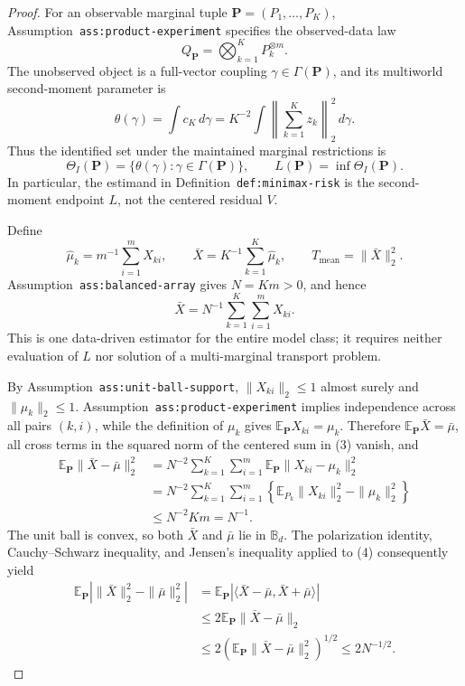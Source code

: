 \documentclass{article}
\begin{document}
\begin{proof}
For an observable marginal tuple \(\mathbf P=(P_1,\ldots,P_K)\), Assumption~\texttt{ass:product-experiment} specifies the observed-data law
\[
Q_{\mathbf P}=\bigotimes_{k=1}^K P_k^{\otimes m}.
\]
The unobserved object is a full-vector coupling \(\gamma\in\Gamma(\mathbf P)\), and its multiworld second-moment parameter is
\[
\theta(\gamma)=\int c_K\,d\gamma
=K^{-2}\int\left\|\sum_{k=1}^K z_k\right\|_2^2\,d\gamma.
\]
Thus the identified set under the maintained marginal restrictions is
\[
\Theta_I(\mathbf P)=\{\theta(\gamma):\gamma\in\Gamma(\mathbf P)\},
\qquad
L(\mathbf P)=\inf\Theta_I(\mathbf P).
\tag{1}
\]
In particular, the estimand in Definition~\texttt{def:minimax-risk} is the second-moment endpoint \(L\), not the centered residual \(V\).

Define
\[
\widehat\mu_k=m^{-1}\sum_{i=1}^m X_{ki},
\qquad
\bar X=K^{-1}\sum_{k=1}^K\widehat\mu_k,
\qquad
T_{\mathrm{mean}}=\|\bar X\|_2^2.
\tag{2}
\]
Assumption~\texttt{ass:balanced-array} gives \(N=Km>0\), and hence
\[
\bar X=N^{-1}\sum_{k=1}^K\sum_{i=1}^m X_{ki}.
\tag{3}
\]
This is one data-driven estimator for the entire model class; it requires neither evaluation of \(\widehat L\) nor solution of a multi-marginal transport problem.

By Assumption~\texttt{ass:unit-ball-support}, \(\|X_{ki}\|_2\leq 1\) almost surely and \(\|\mu_k\|_2\leq 1\).  Assumption~\texttt{ass:product-experiment} implies independence across all pairs \((k,i)\), while the definition of \(\mu_k\) gives \(\mathbb E_{\mathbf P}X_{ki}=\mu_k\).  Therefore \(\mathbb E_{\mathbf P}\bar X=\bar\mu\), all cross terms in the squared norm of the centered sum in (3) vanish, and
\[
\begin{aligned}
\mathbb E_{\mathbf P}\|\bar X-\bar\mu\|_2^2
&=N^{-2}\sum_{k=1}^K\sum_{i=1}^m
  \mathbb E_{\mathbf P}\|X_{ki}-\mu_k\|_2^2\\
&=N^{-2}\sum_{k=1}^K\sum_{i=1}^m
  \left\{\mathbb E_{P_k}\|X_{ki}\|_2^2-\|\mu_k\|_2^2\right\}\\
&\leq N^{-2}Km=N^{-1}.
\end{aligned}
\tag{4}
\]
The unit ball is convex, so both \(\bar X\) and \(\bar\mu\) lie in \(\mathbb B_d\).  The polarization identity, Cauchy--Schwarz inequality, and Jensen's inequality applied to (4) consequently yield
\[
\begin{aligned}
\mathbb E_{\mathbf P}\left|\|\bar X\|_2^2-\|\bar\mu\|_2^2\right|
&=\mathbb E_{\mathbf P}
  \left|\langle\bar X-\bar\mu,\bar X+\bar\mu\rangle\right|\\
&\leq 2\mathbb E_{\mathbf P}\|\bar X-\bar\mu\|_2\\
&\leq 2\left(\mathbb E_{\mathbf P}\|\bar X-\bar\mu\|_2^2\right)^{1/2}
\leq 2N^{-1/2}.
\end{aligned}
\tag{5}
\]


\end{proof}
\end{document}
